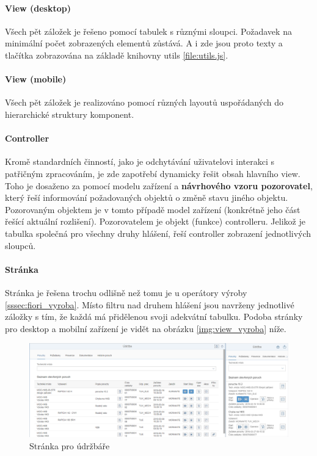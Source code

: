 \documentclass[thesis=M,czech]{FITthesis}[2012/06/26]
\begin{document}
\paragraph{View (desktop)}
Všech pět záložek je řešeno pomocí tabulek s různými sloupci. Požadavek na minimální počet zobrazených elementů zůstává. A i zde jsou proto texty a tlačítka zobrazována na základě knihovny utils \ref{file:utils.js}. 
\paragraph{View (mobile)} 
Všech pět záložek je realizováno pomocí různých layoutů uspořádaných do hierarchické struktury komponent. 
\paragraph{Controller}
Kromě standardních činností, jako je odchytávání uživatelovi interakci s patřičným zpracováním, je zde zapotřebí dynamicky řešit obsah hlavního view. Toho je dosaženo za pomocí modelu zařízení a \textbf{návrhového vzoru pozorovatel}, který řeší informování požadovaných objektů o změně stavu jiného objektu. Pozorovaným objektem je v tomto případě model zařízení (konkrétně jeho část řešící aktuální rozlišení). Pozorovatelem je objekt (funkce) controlleru. Jelikož je tabulka společná pro všechny druhy hlášení, řeší controller zobrazení jednotlivých sloupců. 
\paragraph{Stránka}
Stránka je řešena trochu odlišně než tomu je u operátory výroby \ref{sssec:fiori_vyroba}. Místo filtru nad druhem hlášení jsou navrženy jednotlivé záložky s tím, že každá má přidělenou svoji adekvátní tabulku. Podoba stránky pro desktop a mobilní zařízení je vidět na obrázku \ref{img:view_vyroba} níže.
\begin{figure}[H]
	\centering
	\includegraphics[width=1\textwidth]{images/view_udrzba}
	\caption{Stránka pro údržbáře}
	\label{img:view_udrzba}
\end{figure}	
\end{document}
